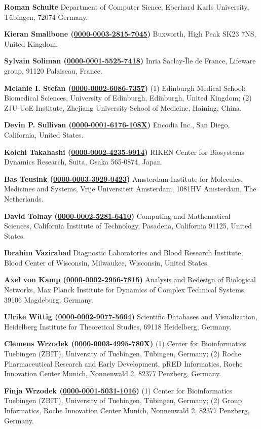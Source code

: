 \documentclass{sbml-paper}
\newcommand{\orcid}[1]{\href{https://orcid.org/#1}{#1}}
\begin{document}
\textbf{Roman Schulte} Department of Computer Sience, Eberhard Karls University, Tübingen, 72074 Germany.

\textbf{Kieran Smallbone (\orcid{0000-0003-2815-7045})} Buxworth, High Peak SK23 7NS, United Kingdom.

\textbf{Sylvain Soliman (\orcid{0000-0001-5525-7418})} Inria Saclay-Île de France, Lifeware group, 91120 Palaiseau, France.

\textbf{Melanie I. Stefan (\orcid{0000-0002-6086-7357})} (1) Edinburgh Medical School: Biomedical Sciences, University of Edinburgh, Edinburgh, United Kingdom; (2) ZJU-UoE Institute, Zhejiang University School of Medicine, Haining, China.

\textbf{Devin P. Sullivan (\orcid{0000-0001-6176-108X})} Encodia Inc., San Diego, California, United States.

\textbf{Koichi Takahashi (\orcid{0000-0002-4235-9914})} RIKEN Center for Biosystems Dynamics Research, Suita, Osaka 565-0874, Japan.

\textbf{Bas Teusink (\orcid{0000-0003-3929-0423})} Amsterdam Institute for Molecules, Medicines and Systems, Vrije Universiteit Amsterdam, 1081HV Amsterdam, The Netherlands.

\textbf{David Tolnay (\orcid{0000-0002-5281-6410})} Computing and Mathematical Sciences, California Institute of Technology, Pasadena, California 91125, United States.

\textbf{Ibrahim Vazirabad} Diagnostic Laboratories and Blood Research Institute, Blood Center of Wisconsin, Milwaukee, Wisconsin, United States.

\textbf{Axel von Kamp (\orcid{0000-0002-2956-7815})} Analysis and Redesign of Biological Networks, Max Planck Institute for Dynamics of Complex Technical Systems, 39106 Magdeburg, Germany.

\textbf{Ulrike Wittig (\orcid{0000-0002-9077-5664})} Scientific Databases and Visualization, Heidelberg Institute for Theoretical Studies, 69118 Heidelberg, Germany.

\textbf{Clemens Wrzodek (\orcid{0000-0003-4995-780X})} (1) Center for Bioinformatics Tuebingen (ZBIT), University of Tuebingen, Tübingen, Germany; (2) Roche Pharmaceutical Research and Early Development, pRED Informatics, Roche Innovation Center Munich, Nonnenwald 2, 82377 Penzberg, Germany.

\textbf{Finja Wrzodek (\orcid{0000-0001-5031-1016})} (1) Center for Bioinformatics Tuebingen (ZBIT), University of Tuebingen, Tübingen, Germany; (2) Group Informatics, Roche Innovation Center Munich, Nonnenwald 2, 82377 Penzberg, Germany.
\end{document}
